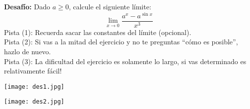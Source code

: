 \question 
\textbf{Desafío:} Dado $a\geq{0}$, calcule el siguiente límite:
$$\lim_{x \to 0} \frac{a^x-a^{\sin{x}}}{x^3}$$
Pista (1): Recuerda sacar las constantes del límite (opcional).\\
Pista (2): Si vas a la mitad del ejercicio y no te preguntas “cómo es posible”, hazlo de nuevo.\\
Pista (3): La dificultad del ejercicio es solamente lo largo, si vas determinado es relativamente fácil!
\droppoints

\begin{solution}
\begin{center}
\texttt{[image: des1.jpg]}
\end{center}
\begin{center}
\texttt{[image: des2.jpg]}
\end{center}
\end{solution}
